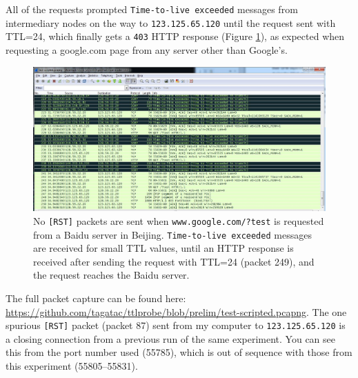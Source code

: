All of the requests prompted \texttt{Time-to-live exceeded} messages from intermediary nodes on the way to \texttt{123.125.65.120} until the request sent with TTL=24, which finally gets a \texttt{403} HTTP response (Figure \ref{fig_gfwtest}), as expected when requesting a google.com page from any server other than Google’s.
\begin{figure}
	\includegraphics[width=\textwidth]{figures/gfwtest}
	\caption{
		No \texttt{[RST]} packets are sent when \texttt{www.google.com/?test} is requested from a Baidu server in Beijing.
		\texttt{Time-to-live exceeded} messages are received for small TTL values, until an HTTP response is received after sending the request with TTL=24 (packet 249), and the request reaches the Baidu server.
	}
	\label{fig_gfwtest}
\end{figure}
The full packet capture can be found here: \url{https://github.com/tagatac/ttlprobe/blob/prelim/test-scripted.pcapng}.
The one spurious \texttt{[RST]} packet (packet 87) sent from my computer to \texttt{123.125.65.120} is a closing connection from a previous run of the same experiment.
You can see this from the port number used (55785), which is out of sequence with those from this experiment (55805--55831).
